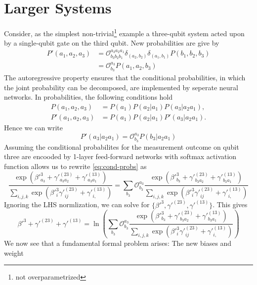 \documentclass[a4]{article}
\begin{document}
\section{Larger Systems}
Consider, as the simplest non-trivial\footnote{not overparametrized} example
a three-qubit system acted upon by a single-qubit gate on the third qubit. New
probabilities are give by
\begin{align*}
    P'(a_1,a_2,a_3) &= \mathcal{O}^{a_3a_2a_1}_{b_3b_2b_1} \delta_{(a_2,b_2)}
                       \delta_{(a_1,b_1)} P(b_1, b_2, b_3) \\
                    &= \mathcal{O}^{a_3}_{b_3} P (a_1, a_2, b_3)
\end{align*}
The autoregressive property ensures that the conditional probabilities, in which
the joint probability can be decomposed, are implemented by seperate neural
networks. In probabilities, the following conditions hold
\begin{align*}
    P(a_1,a_2,a_3) &= P(a_1) P(a_2|a_1)P(a_3|a_2a_1),\\
    P'(a_1,a_2,a_3) &= P(a_1) P(a_2|a_1)P'(a_3|a_2a_1).
\end{align*}
Hence we can write
\begin{equation}
    P'(a_3|a_2a_1) = \mathcal{O}^{a_3}_{b_3} P(b_3|a_2 a_1)
    \label{eq:cond-probs}
\end{equation}
Assuming the conditional probabilites for the measurement outcome on qubit three
are encooded by 1-layer feed-forward networks with softmax activation function
allows us to rewrite \ref{eq:cond-probs} as
\begin{equation*}
    \frac{\exp(\beta'^3_{a_3} + \gamma'^{(23)}_{a_3a_2} +
    \gamma'^{(13)}_{a_3a_1})}{\sum_{i,j,k} \exp(\beta'^3_{i}
    \gamma'^{(23)}_{ij} + \gamma'^{(13)}_{i,})} = \sum_{b_3} \mathcal{O}^{a_3}_{b_3}
    \frac{\exp(\beta'^3_{b_3} + \gamma'^{(23)}_{b_3a_2} +
    \gamma'^{(13)}_{b_3a_1})}{\sum_{i,j,k} \exp(\beta'^3_{i}
    \gamma'^{(23)}_{ij} + \gamma'^{(13)}_{i,})}
\end{equation*}
Ignoring the LHS normlization, we can solve for $\{\beta'^3,\gamma'^{(23)},
\gamma'^{(13)}\}$. This gives
\begin{equation}
  \beta'^3 + \gamma'^{(23)} + \gamma'^{(13)} = \ln( \sum_{b_3}
  \mathcal{O}^{a_3}_{b_3} \frac{\exp(\beta'^3_{b_3} + \gamma'^{(23)}_{b_3a_2} +
  \gamma'^{(13)}_{b_3a_1})}{\sum_{i,j,k} \exp(\beta'^3_{i}
  \gamma'^{(23)}_{ij} + \gamma'^{(13)}_{i,})} )
\end{equation}
We now see that a fundamental formal problem arises: The new biases and weight
\end{document}
